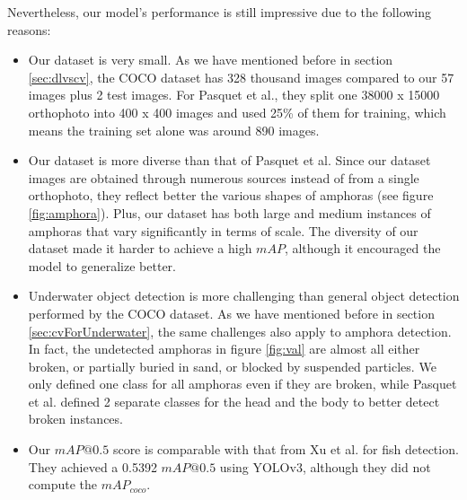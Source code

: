 \documentclass[a4paper, 11pt, oneside]{article}
\begin{document}
Nevertheless, our model's performance is still impressive due to the following reasons:

\begin{itemize}
  \item Our dataset is very small. As we have mentioned before in section \ref{sec:dlvscv}, the COCO dataset has 328
  thousand images compared to our 57 images plus 2 test images. For Pasquet et al., they split one 38000 x 15000
  orthophoto into 400 x 400 images and used 25\% of them for training, which means the training set alone was around
  890 images.
  \item Our dataset is more diverse than that of Pasquet et al. Since our dataset images are obtained through
  numerous sources instead of from a single orthophoto, they reflect better the various shapes of amphoras (see
  figure \ref{fig:amphora}). Plus, our dataset has both large and medium instances of amphoras that vary significantly
  in terms of scale. The diversity of our dataset made it harder to achieve a high $mAP$, although it encouraged
  the model to generalize better.
  \item Underwater object detection is more challenging than general object detection performed by the COCO dataset.
  As we have mentioned before in section \ref{sec:cvForUnderwater}, the same challenges also apply to amphora
  detection. In fact, the undetected amphoras in figure \ref{fig:val} are almost all either broken, or partially buried
  in sand, or blocked by suspended particles. We only defined one class for all amphoras even if they are broken, while
  Pasquet et al. defined 2 separate classes for the head and the body to better detect broken instances.
  \item Our $mAP@0.5$ score is comparable with that from Xu et al. \cite{xu2018underwater} for fish detection. They
  achieved a 0.5392 $mAP@0.5$ using YOLOv3, although they did not compute the $mAP_{coco}$.
\end{itemize}
\end{document}

